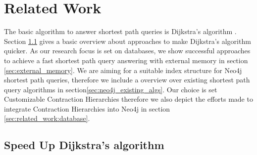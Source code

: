 \chapter{Related Work} 

The basic algorithm to answer shortest path queries is Dijkstra's algorithm \cite{Dijkstra_1959}. 
Section \ref{sec:algorithmic_history} gives a basic overview about approaches to make Dijkstra's algorithm quicker. 
As our research focus is set on databases, we show successful approaches to achieve a fast shortest path query answering with external memory in section \ref{sec:external_memory}.
We are aiming for a suitable index structure for Neo4j shortest path queries, therefore we include a overview over existing shortest path query algorithms in section\ref{sec:neo4j_existing_algs}.
Our choice is set Customizable Contraction Hierarchies \cite{CCH} therefore we also depict the efforts made to integrate Contraction Hierarchies into Neo4j in section \ref{sec:related_work:database}.

\section{Speed Up Dijkstra's algorithm} \label{sec:algorithmic_history}

